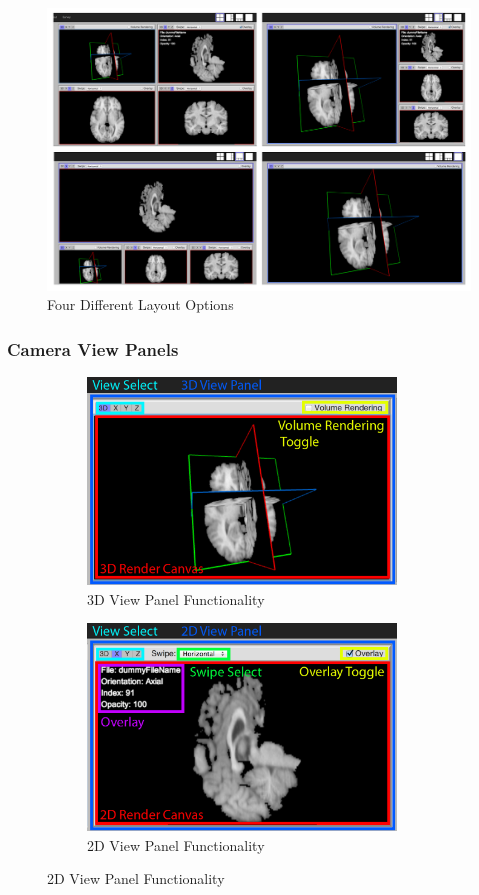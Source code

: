 \documentclass[a4paper,11pt,twoside]{article}
\begin{document}
\begin{figure}[ht!]
\centering
\includegraphics[width=170mm]{graphics/layouts_01.png}
\caption{Four Different Layout Options}
\label{fig:UIdesign1}
\end{figure}


\subsubsection{Camera View Panels}

\begin{figure}
\centering
\begin{subfigure}{.5\textwidth}
  \centering
  \includegraphics[width=82mm]{graphics/features_02b.png}
  \caption{3D View Panel Functionality}
  \label{fig:sub1}
\end{subfigure}%
\begin{subfigure}{.5\textwidth}
  \centering
  \includegraphics[width=82mm]{graphics/features_02.png}
  \caption{2D View Panel Functionality}
  \label{fig:sub2}
\end{subfigure}
\end{figure}
\end{document}

